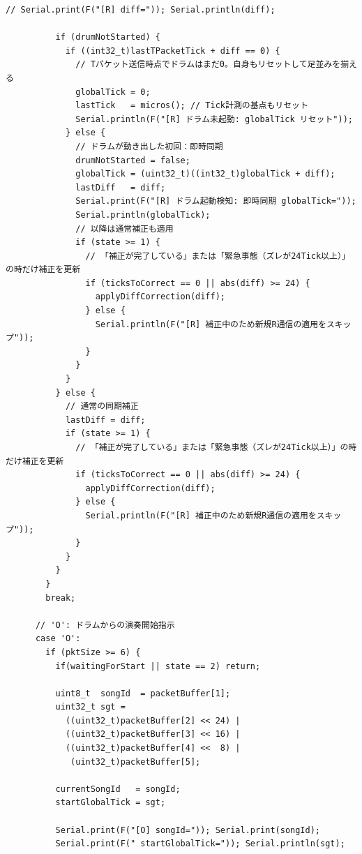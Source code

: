 \begin{lstlisting}[caption={piano\_0706.ino（楽譜データは冒頭2小節のみ掲載）}, label={lst:douki_piano_full}]
          // Serial.print(F("[R] diff=")); Serial.println(diff);

          if (drumNotStarted) {
            if ((int32_t)lastTPacketTick + diff == 0) {
              // Tパケット送信時点でドラムはまだ0。自身もリセットして足並みを揃える
              globalTick = 0;
              lastTick   = micros(); // Tick計測の基点もリセット
              Serial.println(F("[R] ドラム未起動: globalTick リセット"));
            } else {
              // ドラムが動き出した初回：即時同期
              drumNotStarted = false;
              globalTick = (uint32_t)((int32_t)globalTick + diff);
              lastDiff   = diff;
              Serial.print(F("[R] ドラム起動検知: 即時同期 globalTick="));
              Serial.println(globalTick);
              // 以降は通常補正も適用
              if (state >= 1) {
                // 「補正が完了している」または「緊急事態（ズレが24Tick以上）」の時だけ補正を更新
                if (ticksToCorrect == 0 || abs(diff) >= 24) {
                  applyDiffCorrection(diff);
                } else {
                  Serial.println(F("[R] 補正中のため新規R通信の適用をスキップ"));
                }
              }
            }
          } else {
            // 通常の同期補正
            lastDiff = diff;
            if (state >= 1) {
              // 「補正が完了している」または「緊急事態（ズレが24Tick以上）」の時だけ補正を更新
              if (ticksToCorrect == 0 || abs(diff) >= 24) {
                applyDiffCorrection(diff);
              } else {
                Serial.println(F("[R] 補正中のため新規R通信の適用をスキップ"));
              }
            }
          }
        }
        break;

      // 'O': ドラムからの演奏開始指示
      case 'O':
        if (pktSize >= 6) {
          if(waitingForStart || state == 2) return;
          
          uint8_t  songId  = packetBuffer[1];
          uint32_t sgt =
            ((uint32_t)packetBuffer[2] << 24) |
            ((uint32_t)packetBuffer[3] << 16) |
            ((uint32_t)packetBuffer[4] <<  8) |
             (uint32_t)packetBuffer[5];

          currentSongId   = songId;
          startGlobalTick = sgt;

          Serial.print(F("[O] songId=")); Serial.print(songId);
          Serial.print(F(" startGlobalTick=")); Serial.println(sgt);


\end{lstlisting}
